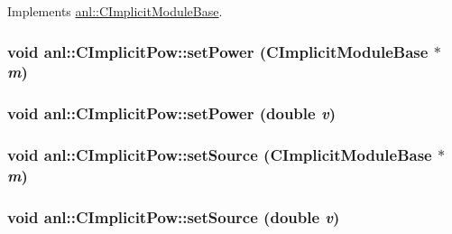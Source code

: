 Implements \hyperlink{classanl_1_1CImplicitModuleBase_ab88f8a1822dcfbc13ba5230318b0acd1}{anl::CImplicitModuleBase}.\hypertarget{classanl_1_1CImplicitPow_a663be4a5421ffcd2dbf2d41574dec821}{
\subsubsection[{setPower}]{\setlength{\rightskip}{0pt plus 5cm}void anl::CImplicitPow::setPower ({\bf CImplicitModuleBase} $\ast$ {\em m})}}
\label{classanl_1_1CImplicitPow_a663be4a5421ffcd2dbf2d41574dec821}
\hypertarget{classanl_1_1CImplicitPow_ae7c4bf26ecc28386101c22c3628e2ca6}{
\subsubsection[{setPower}]{\setlength{\rightskip}{0pt plus 5cm}void anl::CImplicitPow::setPower (double {\em v})}}
\label{classanl_1_1CImplicitPow_ae7c4bf26ecc28386101c22c3628e2ca6}
\hypertarget{classanl_1_1CImplicitPow_a596142e97efeeff173835acda522e933}{
\subsubsection[{setSource}]{\setlength{\rightskip}{0pt plus 5cm}void anl::CImplicitPow::setSource ({\bf CImplicitModuleBase} $\ast$ {\em m})}}
\label{classanl_1_1CImplicitPow_a596142e97efeeff173835acda522e933}
\hypertarget{classanl_1_1CImplicitPow_ac717e60af1d88a41b3d48c3da2430c76}{
\subsubsection[{setSource}]{\setlength{\rightskip}{0pt plus 5cm}void anl::CImplicitPow::setSource (double {\em v})}}
\label{classanl_1_1CImplicitPow_ac717e60af1d88a41b3d48c3da2430c76}


